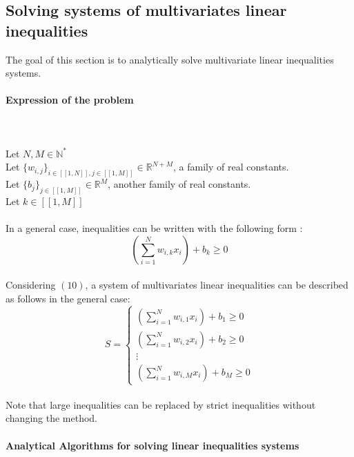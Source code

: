 \documentclass{article}
\begin{document}
\subsection{Solving systems of multivariates linear inequalities }
The goal of this section is to analytically solve multivariate linear inequalities systems.
\paragraph{Expression of the problem} \
\\\\
Let $N,M \in \mathbb{N}^{*}$\\
Let $\{w_{i,j}\}_{i \in [\![1,N]\!],j \in [\![1,M]\!]} \in \mathbb{R}^{N+M}$, a family of real constants.\\
Let $\{b_{j}\}_{j \in [\![1,M]\!]} \in \mathbb{R}^{M}$, another family of real constants.\\
Let $k \in [\![1,M]\!]$
\\\\
In a general case, inequalities can be written with the following form :\\

\begin{equation}
(\sum_{i=1}^{N} w_{i,k}x_{i}) + b_{k} \geqslant 0
\end{equation}
\\
Considering $(10)$, a system of multivariates linear inequalities can be described as follows in the general case:
\\
\begin{equation}
    S=
    \begin{cases}
         (\sum_{i=1}^{N} w_{i,1}x_{i}) + b_{1} \geqslant 0
        \\  (\sum_{i=1}^{N} w_{i,2}x_{i}) + b_{2} \geqslant 0
        \\ \vdots 
        \\  (\sum_{i=1}^{N} w_{i,M}x_{i}) + b_{M} \geqslant 0
    \end{cases}
    \end{equation}
\\
    Note that large inequalities can be replaced by strict inequalities without changing the method.

\paragraph{Analytical Algorithms for solving linear inequalities systems} \ \\
\end{document}

